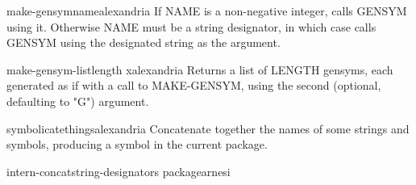 \begin{function}{make-gensym}{name}{alexandria}{}
  If NAME is a non-negative integer, calls GENSYM using it. Otherwise NAME
must be a string designator, in which case calls GENSYM using the designated
string as the argument.
\end{function}

\begin{function}{make-gensym-list}{length \op x}{alexandria}{}
  Returns a list of LENGTH gensyms, each generated as if with a call to MAKE-GENSYM,
using the second (optional, defaulting to "G") argument.
\end{function}

\begin{function}{symbolicate}{\rest things}{alexandria}{}
  Concatenate together the names of some strings and symbols,
producing a symbol in the current package.
\end{function}

\begin{function}{intern-concat}{string-designators \op package}{arnesi}{}
  
\end{function}

